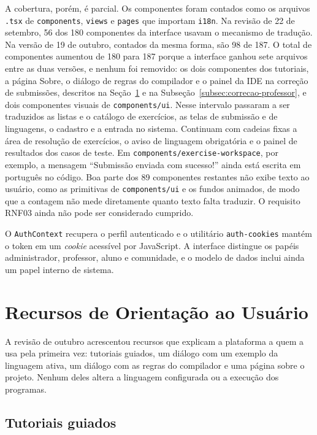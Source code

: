 A cobertura, porém, é parcial. Os componentes foram contados como os arquivos \texttt{.tsx} de \texttt{components}, \texttt{views} e \texttt{pages} que importam \texttt{i18n}. Na revisão de 22 de setembro, 56 dos 180 componentes da interface usavam o mecanismo de tradução. Na versão de 19 de outubro, contados da mesma forma, são 98 de 187. O total de componentes aumentou de 180 para 187 porque a interface ganhou sete arquivos entre as duas versões, e nenhum foi removido: os dois componentes dos tutoriais, a página Sobre, o diálogo de regras do compilador e o painel da IDE na correção de submissões, descritos na Seção~\ref{sec:orientacao-usuario} e na Subseção~\ref{subsec:correcao-professor}, e dois componentes visuais de \texttt{components/ui}. Nesse intervalo passaram a ser traduzidos as listas e o catálogo de exercícios, as telas de submissão e de linguagens, o cadastro e a entrada no sistema. Continuam com cadeias fixas a área de resolução de exercícios, o aviso de linguagem obrigatória e o painel de resultados dos casos de teste. Em \texttt{components/exercise-workspace}, por exemplo, a mensagem ``Submissão enviada com sucesso!'' ainda está escrita em português no código. Boa parte dos 89 componentes restantes não exibe texto ao usuário, como as primitivas de \texttt{components/ui} e os fundos animados, de modo que a contagem não mede diretamente quanto texto falta traduzir. O requisito RNF03 ainda não pode ser considerado cumprido.

O \texttt{AuthContext} recupera o perfil autenticado e o utilitário \texttt{auth-cookies} mantém o token em um \textit{cookie} acessível por JavaScript. A interface distingue os papéis administrador, professor, aluno e comunidade, e o modelo de dados inclui ainda um papel interno de sistema.

\section{Recursos de Orientação ao Usuário}
\label{sec:orientacao-usuario}

A revisão de outubro acrescentou recursos que explicam a plataforma a quem a usa pela primeira vez: tutoriais guiados, um diálogo com um exemplo da linguagem ativa, um diálogo com as regras do compilador e uma página sobre o projeto. Nenhum deles altera a linguagem configurada ou a execução dos programas.

\subsection{Tutoriais guiados}
\label{subsec:tutoriais}


